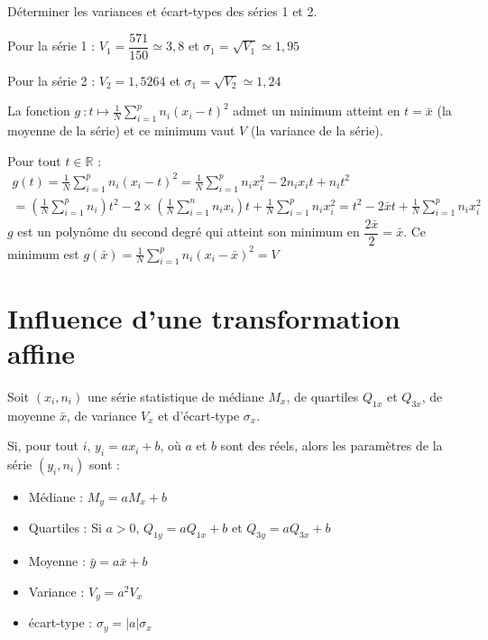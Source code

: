 \documentclass[french]{book}
\newcommand{\R}{\mathbb {R}}
\newcommand{\ds}{\displaystyle}
\begin{document}
\begin{exemple}
D\'eterminer les variances et \'ecart-types des s\'eries 1 et 2.
\end{exemple}


Pour la s\'erie 1 : $V_1=\dfrac{571}{150}\simeq3,8$ et $\sigma_1=\sqrt{V_1}\simeq1,95$

Pour la s\'erie 2 : $V_2=1,5264$ et $\sigma_1=\sqrt{V_2}\simeq1,24$


\vspace{2ex}
\begin{prop}
La fonction $\ds g~: t \longmapsto  \frac{1}{N}\sum_{i=1}^{p} n_{i}(x_{i}-t)^{2}$ admet un minimum atteint en $t=\bar{x}$ (la moyenne de la s\'erie) et ce minimum vaut $V$ (la variance de la s\'erie).
\end{prop}

\begin{demo}
Pour tout $t\in\R$ :
\begin{multline*}
g(t)=\frac{1}{N}\sum_{i=1}^{p} n_{i}(x_{i}-t)^{2}
= \frac{1}{N}\sum_{i=1}^{p}n_{i}x_{i}^{2}-2n_{i}x_{i}t+n_{i}t^{2}\\
= \left( \frac{1}{N}\sum_{i=1}^{p}n_{i} \right)t^{2} - 2\times\left(\frac{1}{N}\sum_{i=1}^{n}n_{i}x_{i} \right)t + \frac{1}{N}\sum_{i=1}^{p}n_{i}x_{i}^{2}
= t^{2}-2\bar{x}t+\frac{1}{N}\sum_{i=1}^{p}n_{i}x_{i}^{2}
\end{multline*}
$g$ est un polynôme du second degr\'e qui atteint son minimum en $\dfrac{2\bar{x}}{2}=\bar{x}$. Ce minimum est $g(\bar{x})=\frac{1}{N}\sum_{i=1}^{p} n_{i}(x_{i}-\bar{x})^{2}=V$
\vspace{-1ex}
\end{demo}
\section{Influence d'une transformation affine}
\begin{prop}
Soit $(x_i,n_i)$  une s\'erie statistique de m\'ediane $M_x$, de quartiles $Q_{1x}$ et $Q_{3x}$, de moyenne $\bar{x}$, de variance $V_x$ et d'\'ecart-type $\sigma_x$.

Si, pour tout $i$, $y_i=ax_i+b$, où $a$ et $b$ sont des r\'eels, alors les param\`etres de la s\'erie $(y_i,n_i)$ sont :
\begin{itemize}
\item M\'ediane : $M_y=aM_x+b$
\item Quartiles : Si $a>0$, $Q_{1y}=aQ_{1x}+b$ et $Q_{3y}=aQ_{3x}+b$
\item Moyenne : $\bar{y}=a\bar{x}+b$
\item Variance : $V_y=a^2V_x$
\item \'ecart-type : $\sigma_y=|a|\sigma_x$
\end{itemize}
\end{prop}
\end{document}
